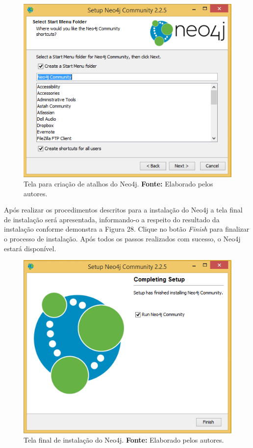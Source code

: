\begin{figure}[h!]
	\centerline{\includegraphics[scale=0.4]{./imagens/neo4j-install-step4.png}}
	\caption[Tela para criação de atalhos do Neo4j]
	{Tela para criação de atalhos do Neo4j. \textbf{Fonte:} Elaborado pelos autores.}
	\label{fig:exemplo1}
\end{figure}

\par Após realizar os procedimentos descritos para a instalação do Neo4j a tela final de instalação será apresentada, informando-o a respeito do resultado da instalação conforme demonstra a Figura 28. Clique no botão \textit{Finish} para finalizar o processo de instalação.
Após todos os passos realizados com sucesso, o Neo4j estará disponível.

\begin{figure}[h!]
	\centerline{\includegraphics[scale=0.4]{./imagens/neo4j-install-step5.png}}
	\caption[Tela final de instalação do Neo4j]
	{Tela final de instalação do Neo4j. \textbf{Fonte:} Elaborado pelos autores.}
	\label{fig:exemplo1}
	
\end{figure}

